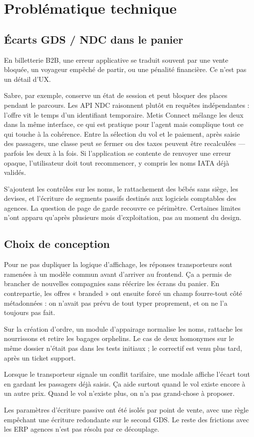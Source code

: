 \chapter{Problématique technique}
\label{chap:problematique}

\section{Écarts GDS / NDC dans le panier}

En billetterie B2B, une erreur applicative se traduit souvent par une vente bloquée, un voyageur empêché de partir, ou une pénalité financière. Ce n'est pas un détail d'UX.

Sabre, par exemple, conserve un état de session et peut bloquer des places pendant le parcours. Les API NDC raisonnent plutôt en requêtes indépendantes : l'offre vit le temps d'un identifiant temporaire. Metis Connect mélange les deux dans la même interface, ce qui est pratique pour l'agent mais complique tout ce qui touche à la cohérence. Entre la sélection du vol et le paiement, après saisie des passagers, une classe peut se fermer ou des taxes peuvent être recalculées --- parfois les deux à la fois. Si l'application se contente de renvoyer une erreur opaque, l'utilisateur doit tout recommencer, y compris les noms IATA déjà validés.

S'ajoutent les contrôles sur les noms, le rattachement des bébés sans siège, les devises, et l'écriture de segments passifs destinés aux logiciels comptables des agences. La question de page de garde recouvre ce périmètre. Certaines limites n'ont apparu qu'après plusieurs mois d'exploitation, pas au moment du design.

\section{Choix de conception}

Pour ne pas dupliquer la logique d'affichage, les réponses transporteurs sont ramenées à un modèle commun avant d'arriver au frontend. Ça a permis de brancher de nouvelles compagnies sans réécrire les écrans du panier. En contrepartie, les offres « branded » ont ensuite forcé un champ fourre-tout côté métadonnées : on n'avait pas prévu de tout typer proprement, et on ne l'a toujours pas fait.

Sur la création d'ordre, un module d'appairage normalise les noms, rattache les nourrissons et retire les bagages orphelins. Le cas de deux homonymes sur le même dossier n'était pas dans les tests initiaux ; le correctif est venu plus tard, après un ticket support.

Lorsque le transporteur signale un conflit tarifaire, une modale affiche l'écart tout en gardant les passagers déjà saisis. Ça aide surtout quand le vol existe encore à un autre prix. Quand le vol n'existe plus, on n'a pas grand-chose à proposer.

Les paramètres d'écriture passive ont été isolés par point de vente, avec une règle empêchant une écriture redondante sur le second GDS. Le reste des frictions avec les ERP agences n'est pas résolu par ce découplage.
